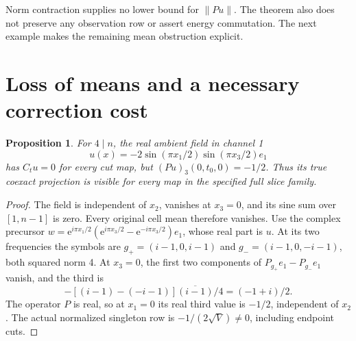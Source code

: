 \documentclass[11pt,a4paper]{article}
\newtheorem{proposition}[theorem]{Proposition}
\newcommand{\norm}[1]{\lVert#1\rVert}
\newcommand{\e}{\mathrm e}
\begin{document}
Norm contraction supplies no lower bound for $\norm{Pu}$. The theorem also
does not preserve any observation row or assert energy commutation. The next
example makes the remaining mean obstruction explicit.

\section{Loss of means and a necessary correction cost}
\begin{proposition}\label{loss}
For $4\mid n$, the real ambient field in channel 1
\[
 u(x)=-2\sin(\pi x_1/2)\sin(\pi x_3/2)e_1
\]
has $C_tu=0$ for every cut map, but
$(Pu)_3(0,t_0,0)=-1/2$. Thus its true coexact projection is visible for
every map in the specified full slice family.
\end{proposition}
\begin{proof}
The field is independent of $x_2$, vanishes at $x_3=0$, and its sine sum
over $[1,n-1]$ is zero. Every original cell mean therefore vanishes.
Use the complex precursor
$w=\e^{i\pi x_1/2}(\e^{i\pi x_3/2}-\e^{-i\pi x_3/2})e_1$, whose real
part is $u$. At its two frequencies the symbols are
$g_+=(i-1,0,i-1)$ and $g_-=(i-1,0,-i-1)$, both squared norm 4.
At $x_3=0$, the first two components of
$P_{g_+}e_1-P_{g_-}e_1$ vanish, and the third is
\[
 -[(i-1)-(-i-1)]\overline{(i-1)}/4=(-1+i)/2.
\]
The operator $P$ is real, so at $x_1=0$ its real third value is $-1/2$,
independent of $x_2$. The actual normalized singleton row is
$-1/(2\sqrt V)\ne0$, including endpoint cuts.
\end{proof}
\end{document}
